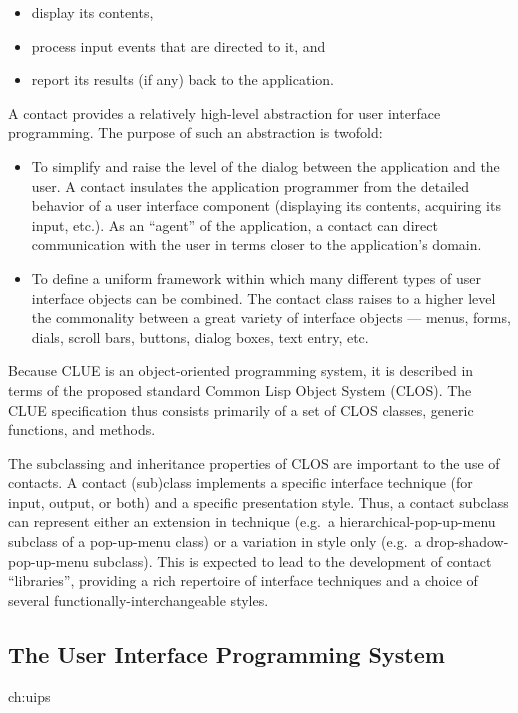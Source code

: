 \documentclass[twoside]{book}
\begin{document}
\begin{sloppy}
\begin{itemize}
\item  display its contents,
\item process input events that are directed to it, and 
\item report its results (if any) back to the application.
\end{itemize}

A contact provides a relatively high-level abstraction for user interface
programming. The purpose of such an abstraction is twofold: 

\begin{itemize}	

\item To simplify and raise the level of the dialog between the application and
the user. A contact insulates the application programmer from the detailed behavior
of a user interface component (displaying its contents, acquiring its input,
etc.). As an ``agent'' of the application, a contact can direct 
communication with the user in terms closer to the application's domain.

\item To define a uniform framework within which many different types of user
interface objects can be combined. The contact class raises to a higher level the
commonality between a great variety of interface objects --- menus, forms,
dials, scroll bars, buttons, dialog boxes, text entry, etc.

\end{itemize}

Because CLUE is an object-oriented programming system, it is described
in terms of the proposed standard
Common Lisp Object System (CLOS)\cite{clos}. The CLUE
specification thus
consists primarily of a set of CLOS classes, generic functions, and methods. 

The subclassing and inheritance properties of CLOS are
important to the use of contacts. A contact (sub)class implements a
specific interface technique (for input, output, or both) and a specific
presentation style. Thus, a contact subclass
can represent either an extension in technique (e.g.\ a hierarchical-pop-up-menu
subclass of a pop-up-menu class) or a variation in style only (e.g.\ a
drop-shadow-pop-up-menu subclass). This is expected to lead to the development
of contact ``libraries'', providing a rich repertoire of interface
techniques and a choice of several functionally-interchangeable styles.

\subsection {The User Interface Programming System}{ch:uips}



\end{sloppy}
\end{document}
